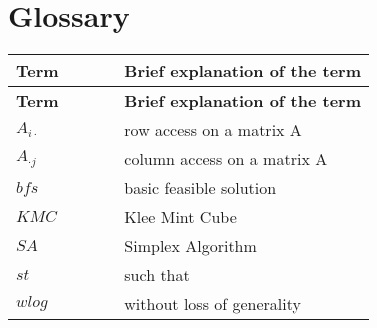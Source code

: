 \documentclass[main]{subfiles}
\begin{document}
\section{Glossary}
\renewcommand{\arraystretch}{1.5}


\begin{longtable}{p{0.3\linewidth} p{0.7\linewidth}}
\hline \textbf{Term} & \textbf{Brief explanation of the term}\\ \hline
\endfirsthead

\hline \textbf{Term} & \textbf{Brief explanation of the term}\\ \hline\hline
\endhead
$A_{i\cdot}$ & row access on a matrix A\\
$A_{\cdot j}$ & column access on a matrix A\\
$bfs$ & basic feasible solution\\
$KMC$ & Klee Mint Cube\\
$SA$ & Simplex Algorithm\\
$st$ & such that\\
$wlog$ & without loss of generality\\

\end{longtable}
\end{document}
